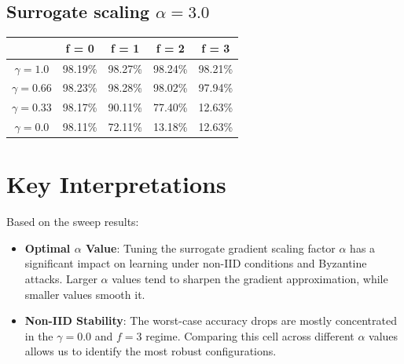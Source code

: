 \documentclass{article}
\begin{document}
\subsection{Surrogate scaling $\alpha = 3.0$}
\begin{table}[htbp]
    \centering
    \begin{tabular}{ccccc}
        \toprule
        & \textbf{f = 0} & \textbf{f = 1} & \textbf{f = 2} & \textbf{f = 3} \\
        \midrule
        $\gamma = 1.0$ & 98.19\% & 98.27\% & 98.24\% & 98.21\% \\
        $\gamma = 0.66$ & 98.23\% & 98.28\% & 98.02\% & 97.94\% \\
        $\gamma = 0.33$ & 98.17\% & 90.11\% & 77.40\% & 12.63\% \\
        $\gamma = 0.0$ & 98.11\% & 72.11\% & 13.18\% & 12.63\% \\
        \bottomrule
    \end{tabular}
\end{table}

\section{Key Interpretations}
Based on the sweep results:
\begin{itemize}
    \item \textbf{Optimal $\alpha$ Value}: Tuning the surrogate gradient scaling factor $\alpha$ has a significant impact on learning under non-IID conditions and Byzantine attacks. Larger $\alpha$ values tend to sharpen the gradient approximation, while smaller values smooth it.
    \item \textbf{Non-IID Stability}: The worst-case accuracy drops are mostly concentrated in the $\gamma = 0.0$ and $f = 3$ regime. Comparing this cell across different $\alpha$ values allows us to identify the most robust configurations.
\end{itemize}
\end{document}
